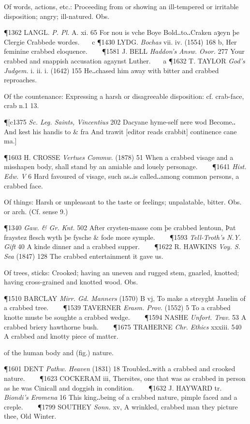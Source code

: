 \begin{description}[wide, labelwidth=!, labelindent=0pt]
\begin{myenumerate}
 Of words, actions, etc.: Proceeding from or showing an ill-tempered or irritable disposition; angry; ill-natured. Obs.

\P 1362 LANGL.  \textit{P. Pl.} A. xi. 65 For nou is vche Boye Bold‥to‥Craken aȝeyn þe Clergie Crabbede wordes.    c 
\P 1430 LYDG.  \textit{Bochas} vii. iv. (1554) 168 b, Her feminine crabbed eloquence.    
\P 1581 J. BELL  \textit{Haddon's Answ. Osor.} 277 Your crabbed and snappish accusation agaynst Luther.    a 
\P 1632 T. TAYLOR  \textit{God's Judgem.} i. ii. i. (1642) 155 He‥chased him away with bitter and crabbed reproaches.

 Of the countenance: Expressing a harsh or disagreeable disposition: cf. crab-face, crab n.1 13.

\P [c1375  \textit{Sc. Leg. Saints, Vincentius} 202 Dacyane hyme-self nere wod Become‥And kest his handis to \& fra And trawit [editor reads crabbit] continence cane ma.]

\P 1603 H. CROSSE  \textit{Vertues Commw.} (1878) 51 When a crabbed visage and a misshapen body, shall stand by an amiable and louely personage.    
\P 1641  \textit{Hist. Edw. V} 6 Hard favoured of visage, such as‥is called‥among common persons, a crabbed face.

 Of things: Harsh or unpleasant to the taste or feelings; unpalatable, bitter. Obs. or arch. (Cf. sense 9.)

\P 1340  \textit{Gaw. \& Gr. Knt.} 502 After crysten-masse com þe crabbed lentoun, Þat fraystez flesch wyth þe fysche \& fode more symple.    
\P 1593 \textit{Tell-Troth's  N.Y. Gift} 40 A kinde dinner and a crabbed supper.    
\P 1622 R. HAWKINS  \textit{Voy. S. Sea} (1847) 128 The crabbed entertainment it gave us.

 Of trees, sticks: Crooked; having an uneven and rugged stem, gnarled, knotted; having cross-grained and knotted wood. Obs.

\P 1510 BARCLAY  \textit{Mirr. Gd. Manners} (1570) B vj, To make a streyght Jauelin of a crabbed tree.    
\P 1539 TAVERNER  \textit{Erasm. Prov.} (1552) 5 To a crabbed knotte muste be soughte a crabbed wedge.    
\P 1594 NASHE  \textit{Unfort. Trav.} 53 A crabbed briery hawthorne bush.    
\P 1675 TRAHERNE  \textit{Chr. Ethics} xxxiii. 540 A crabbed and knotty piece of matter.

 of the human body and (fig.) nature.

\P 1601 DENT  \textit{Pathw. Heaven} (1831) 18 Troubled‥with a crabbed and crooked nature.    
\P 1623 COCKERAM  iii, Thersites, one that was as crabbed in person as he was Cinicall and doggish in condition.    
\P 1632 J. HAYWARD  tr. \textit{Biondi's Eromena} 16 This king‥being of a crabbed nature, pimple faced and a creple.    
\P 1799 SOUTHEY  \textit{Sonn.} xv, A wrinkled, crabbed man they picture thee, Old Winter.


\end{myenumerate}
\end{description}
